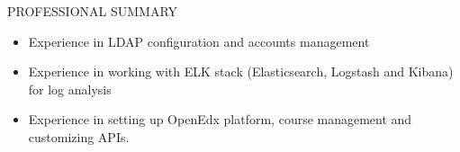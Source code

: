 \documentclass{resume} %
\begin{document}
\begin{rSection}{PROFESSIONAL SUMMARY}
\begin{itemize}
  \item Experience in LDAP configuration and accounts
    management
    
  \item Experience in working with ELK stack (Elasticsearch,
    Logstash and Kibana) for log analysis
    
  \item Experience in setting up OpenEdx platform, course
    management and customizing APIs.

  \end{itemize}

\end{rSection}

\end{document}
